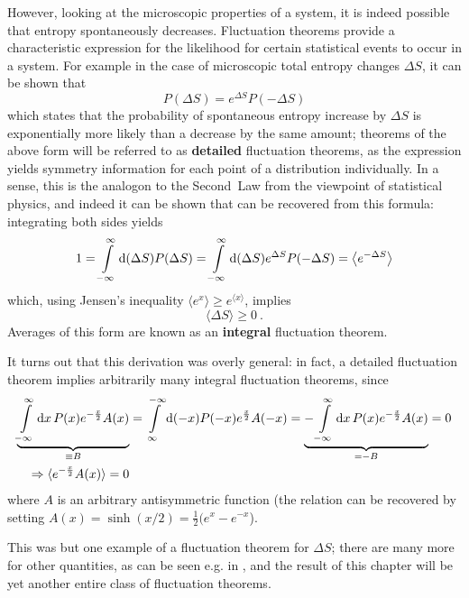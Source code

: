However, looking at the microscopic properties of a system, it is indeed possible that entropy spontaneously decreases. Fluctuation theorems provide a characteristic expression for the likelihood for certain statistical events to occur in a system. For example in the case of microscopic total entropy changes \(\Delta S\), it can be shown that
%
\begin{equation}
	P(\Delta S) = e^{\Delta S}P(-\Delta S)
\end{equation}
%
which states that the probability of spontaneous entropy increase by \(\Delta S\) is exponentially more likely than a decrease by the same amount; theorems of the above form will be referred to as \textbf{detailed} fluctuation theorems, as the expression yields symmetry information for each point of a distribution individually. In a sense, this is the analogon to the Second~Law from the viewpoint of statistical physics, and indeed it can be shown that  can be recovered from this formula: integrating both sides yields
%
\begin{equation}
	\label{eqn:average of exp}
	1 = \int\limits_{-\infty}^\infty \mathrm{d} (\Delta S) P(\Delta S) = \int\limits_{-\infty}^\infty \mathrm{d} (\Delta S) e^{\Delta S}P(-\Delta S) = \left\langle e^{-\Delta S} \right\rangle
\end{equation}
%
which, using Jensen's inequality \(\langle e^x\rangle \geq e^{\langle x\rangle}\), implies
%
\begin{equation}
	\langle\Delta S\rangle \geq 0 ~.
\end{equation}
%
Averages of this form are known as an \textbf{integral} fluctuation theorem.

It turns out that this derivation was overly general: in fact, a detailed fluctuation theorem implies arbitrarily many integral fluctuation theorems, since
%
\begin{align}
	\notag
	   \underbrace{\int\limits_{-\infty}^\infty\mathrm{d} x \, P(x) e^{-\frac x2}A(x)}_{\equiv B}
	&= \int\limits_\infty^{-\infty}\mathrm{d}(-x) P(-x) e^{\frac x2}A(-x)
	 = \underbrace{- \int\limits_{-\infty}^\infty\mathrm{d} x \, P(x) e^{-\frac x2}A(x)}_{= -B}
	 = 0
	\\
	\label{eqn:antisymmetric exp average}
	\Rightarrow
	\langle e^{-\frac x2}A(x)\rangle = 0
\end{align}
%
where \(A\) is an arbitrary antisymmetric function (the relation  can be recovered by setting \(A(x) = \sinh(x/2) = \frac12(e^x-e^{-x}\)).

This was but one example of a fluctuation theorem for \(\Delta S\); there are many more for other quantities, as can be seen e.g. in \cite{seifert-review}, and the result of this chapter will be yet another entire class of fluctuation theorems.


